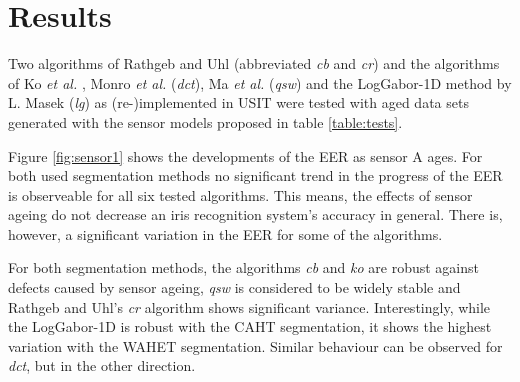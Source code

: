 \documentclass[10pt,twocolumn,letterpaper]{article}
\providecommand{\etal}[0]{\textit{et al.} }
\begin{document}
 \section{Results}
 \label{results}
 Two algorithms of Rathgeb and Uhl (abbreviated \emph{cb} and \emph{cr}) 
 and the algorithms of Ko \etal,
Monro \etal (\emph{dct}),
 Ma \etal(\emph{qsw})
  and the LogGabor-1D method by L. Masek (\emph{lg}) as (re-)implemented in USIT were tested with aged data sets generated with the sensor models proposed in table \ref{table:tests}.
 
 Figure \ref{fig:sensor1} shows the developments of the EER as sensor A ages. For both used segmentation methods no significant trend in the progress of the EER is observeable for all six tested algorithms. This means, the effects of sensor ageing do not decrease an iris recognition system's accuracy in general. There is, however, a significant variation in the EER for some of the algorithms. 
  
For both segmentation methods, the algorithms \emph{cb} and \emph{ko} are robust against defects caused by sensor ageing, \emph{qsw} is considered to be widely stable and Rathgeb and Uhl's \emph{cr} algorithm shows significant variance. Interestingly, while the LogGabor-1D is robust with the CAHT segmentation, it shows the highest variation with the WAHET segmentation. Similar behaviour can be observed for \emph{dct}, but in the other direction.
\end{document}
